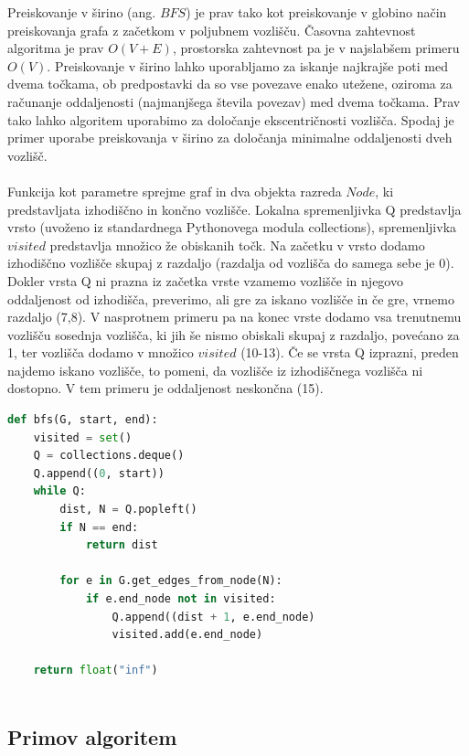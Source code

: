\documentclass[11pt]{article}
\begin{document}
Preiskovanje v širino (ang. $BFS$) je prav tako kot preiskovanje v globino način preiskovanja grafa z začetkom v poljubnem vozlišču. Časovna zahtevnost algoritma je prav $O(V + E)$, prostorska zahtevnost pa je v najslabšem primeru $O(V)$. Preiskovanje v širino lahko uporabljamo za iskanje najkrajše poti med dvema točkama, ob predpostavki da so vse povezave enako utežene, oziroma za računanje oddaljenosti (najmanjšega števila povezav) med dvema točkama. Prav tako lahko algoritem uporabimo za določanje ekscentričnosti vozlišča. Spodaj je primer uporabe preiskovanja v širino za določanja minimalne oddaljenosti dveh vozlišč.
\\ \\
Funkcija kot parametre sprejme graf in dva objekta razreda $Node$, ki predstavljata izhodiščno in končno vozlišče. Lokalna spremenljivka Q predstavlja vrsto (uvoženo iz standardnega Pythonovega modula collections), spremenljivka $visited$ predstavlja množico že obiskanih točk. Na začetku v vrsto dodamo izhodiščno vozlišče skupaj z razdaljo (razdalja od vozlišča do samega sebe je 0). Dokler vrsta Q ni prazna iz začetka vrste vzamemo vozlišče in njegovo oddaljenost od izhodišča, preverimo, ali gre za iskano vozlišče in če gre, vrnemo razdaljo (7,8). V nasprotnem primeru pa na konec vrste dodamo vsa trenutnemu vozlišču sosednja vozlišča, ki jih še nismo obiskali skupaj z razdaljo, povećano za 1, ter vozlišča dodamo v množico $visited$ (10-13). Če se vrsta Q izprazni, preden najdemo iskano vozlišče, to pomeni, da vozlišče iz izhodiščnega vozlišča ni dostopno. V tem primeru je oddaljenost neskončna (15). \cite{bfs}

\begin{lstlisting}[language=Python, caption=Presikovanje v širino]
def bfs(G, start, end):
    visited = set()
    Q = collections.deque()
    Q.append((0, start))
    while Q:
        dist, N = Q.popleft()		
        if N == end:
	        return dist        
        
        for e in G.get_edges_from_node(N):
            if e.end_node not in visited:            
                Q.append((dist + 1, e.end_node)
                visited.add(e.end_node)
    
    return float("inf")
    
\end{lstlisting}

\subsection{Primov algoritem}
\end{document}
